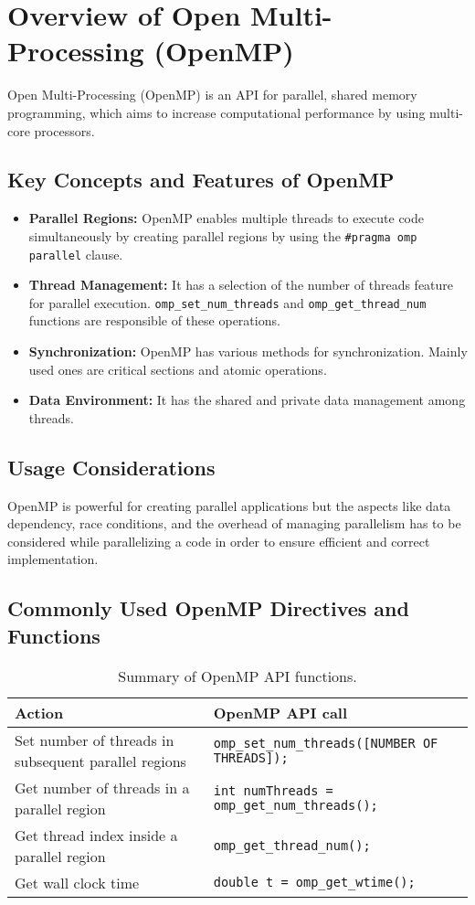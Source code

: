 \section{Overview of Open Multi-Processing (OpenMP)}

Open Multi-Processing (OpenMP) is an API for parallel, shared memory programming, which aims to increase computational performance by using multi-core processors.

\subsection{Key Concepts and Features of OpenMP}
\begin{itemize}
    \item \textbf{Parallel Regions:} OpenMP enables multiple threads to execute code simultaneously by creating parallel regions by using the \texttt{\#pragma omp parallel} clause.
    \item \textbf{Thread Management:} It has a selection of the number of threads feature for parallel execution. \texttt{omp\_set\_num\_threads} and \texttt{omp\_get\_thread\_num} functions are responsible of these operations.
    \item \textbf{Synchronization:} OpenMP has various methods for synchronization. Mainly used ones are critical sections and atomic operations.
    \item \textbf{Data Environment:} It has the shared and private data management among threads.
\end{itemize}

\subsection{Usage Considerations}
OpenMP is powerful for creating parallel applications but the aspects like data dependency, race conditions, and the overhead of managing parallelism has to be considered while parallelizing a code in order to ensure efficient and correct implementation.

\subsection{Commonly Used OpenMP Directives and Functions}
\begin{table}[H]
\caption{Summary of OpenMP API functions.}
\centering
\begin{tabular}{>{\raggedright\arraybackslash}m{6cm}|m{10cm}}
\hline
\textbf{Action} & \textbf{OpenMP API call} \\
\hline
Set number of threads in subsequent parallel regions & \texttt{omp\_set\_num\_threads([NUMBER OF THREADS]);} \\
Get number of threads in a parallel region & \texttt{int numThreads = omp\_get\_num\_threads();} \\
Get thread index inside a parallel region & \texttt{omp\_get\_thread\_num();} \\
Get wall clock time & \texttt{double t = omp\_get\_wtime();} \\
\hline
\end{tabular}
\label{table:openmp_api_functions}
\end{table}

